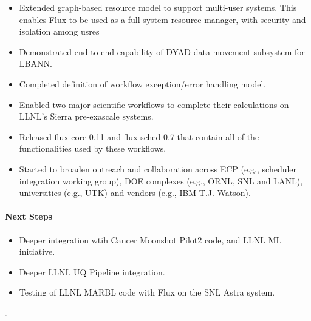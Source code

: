 \begin{itemize}

\item Extended graph-based resource model to support multi-user systems. This
      enables Flux to be used as a full-system resource manager, with security
      and isolation among usres

\item Demonstrated end-to-end capability of DYAD data movement subsystem for LBANN.

\item Completed definition of workflow exception/error handling model.

\item Enabled two major scientific workflows to complete their calculations on
      LLNL’s Sierra pre-exascale systems.

\item Released flux-core 0.11 and flux-sched 0.7 that contain all of the
      functionalities used by these workflows.

\item Started to broaden outreach and collaboration across ECP (e.g., scheduler
      integration working group), DOE complexes (e.g., ORNL, SNL and LANL),
      universities (e.g., UTK) and vendors (e.g., IBM T.J. Watson).

\end{itemize}


\paragraph{Next Steps}

\begin{itemize}
\item Deeper integration wtih Cancer Moonshot Pilot2 code, and LLNL ML initiative.
\item Deeper LLNL UQ Pipeline integration.
\item Testing of LLNL MARBL code with Flux on the SNL Astra system.
\end{itemize}
.
